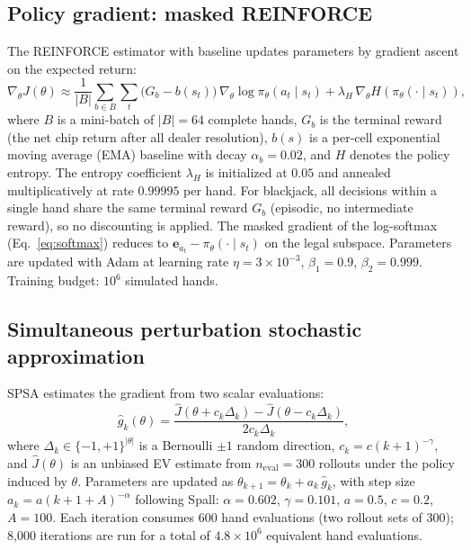 \documentclass[12pt]{article}
\begin{document}
\subsection{Policy gradient: masked REINFORCE}

The REINFORCE estimator\cite{Williams1992} with baseline updates parameters by gradient
ascent on the expected return:
\begin{equation}
  \nabla_\theta J(\theta) \approx \frac{1}{|B|} \sum_{b \in B}
  \sum_t \bigl(G_b - b(s_t)\bigr)\,\nabla_\theta \log \pi_\theta(a_t \mid s_t)
  + \lambda_H\,\nabla_\theta H(\pi_\theta(\cdot \mid s_t)),
  \label{eq:pg}
\end{equation}
where $B$ is a mini-batch of $|B|=64$ complete hands, $G_b$ is the terminal reward
(the net chip return after all dealer resolution), $b(s)$ is a per-cell exponential
moving average (EMA) baseline with decay $\alpha_b = 0.02$, and $H$ denotes the
policy entropy.  The entropy coefficient $\lambda_H$ is initialized at $0.05$ and
annealed multiplicatively at rate $0.99995$ per hand.  For blackjack, all decisions
within a single hand share the same terminal reward $G_b$ (episodic, no intermediate
reward), so no discounting is applied.  The masked gradient of the log-softmax
(Eq.~\ref{eq:softmax}) reduces to $\mathbf{e}_{a_t} - \pi_\theta(\cdot \mid s_t)$ on
the legal subspace.  Parameters are updated with Adam\cite{Kingma2015} at learning
rate $\eta = 3 \times 10^{-3}$, $\beta_1 = 0.9$, $\beta_2 = 0.999$.
Training budget: $10^6$ simulated hands.

\subsection{Simultaneous perturbation stochastic approximation}

SPSA\cite{Spall1992,Spall1998} estimates the gradient from two scalar evaluations:
\begin{equation}
  \hat{g}_k(\theta) = \frac{\hat{J}(\theta + c_k \Delta_k) - \hat{J}(\theta - c_k \Delta_k)}{2c_k \Delta_k},
\end{equation}
where $\Delta_k \in \{-1,+1\}^{|\theta|}$ is a Bernoulli $\pm 1$ random direction,
$c_k = c(k+1)^{-\gamma}$, and $\hat{J}(\theta)$ is an unbiased EV estimate from
$n_\mathrm{eval} = 300$ rollouts under the policy induced by $\theta$.  Parameters are
updated as $\theta_{k+1} = \theta_k + a_k\,\hat{g}_k$, with step size
$a_k = a(k+1+A)^{-\alpha}$ following Spall\cite{Spall1992}: $\alpha=0.602$,
$\gamma=0.101$, $a=0.5$, $c=0.2$, $A=100$.  Each iteration consumes $600$
hand evaluations (two rollout sets of 300); 8,000 iterations are run for a total of
$4.8 \times 10^6$ equivalent hand evaluations.
\end{document}
